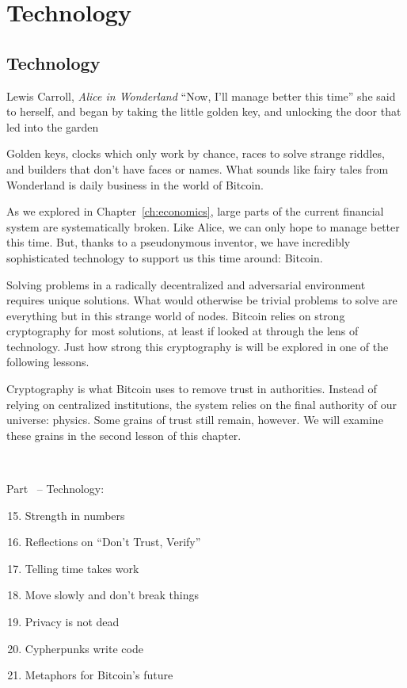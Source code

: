 \part{Technology}
\label{ch:technology}
\chapter*{Technology}

\begin{chapquote}{Lewis Carroll, \textit{Alice in Wonderland}}
\enquote{Now, I'll manage better this time} she said to herself, and began by taking
the little golden key, and unlocking the door that led into the garden
\end{chapquote}

Golden keys, clocks which only work by chance, races to solve
strange riddles, and builders that don't have faces or names. What sounds like
fairy tales from Wonderland is daily business in the world of Bitcoin.

As we explored in Chapter~\ref{ch:economics}, large parts of the current financial
system are systematically broken. Like Alice, we can only hope to manage better
this time. But, thanks to a pseudonymous inventor, we have incredibly
sophisticated technology to support us this time around: Bitcoin.

Solving problems in a radically decentralized and adversarial environment
requires unique solutions. What would otherwise be trivial problems to solve
are everything but in this strange world of nodes. Bitcoin relies on strong
cryptography for most solutions, at least if looked at through the lens of
technology. Just how strong this cryptography is will be explored in one of the
following lessons.

Cryptography is what Bitcoin uses to remove trust in authorities.
Instead of relying on centralized institutions, the system relies on the final
authority of our universe: physics. Some grains of trust still remain, however.
We will examine these grains in the second lesson of this chapter.

~

\begin{samepage}
Part~\ref{ch:technology} -- Technology:

\begin{enumerate}
  \setcounter{enumi}{14}
  \item Strength in numbers
  \item Reflections on \enquote{Don't Trust, Verify}
  \item Telling time takes work
  \item Move slowly and don't break things
  \item Privacy is not dead
  \item Cypherpunks write code
  \item Metaphors for Bitcoin's future
\end{enumerate}
\end{samepage}

